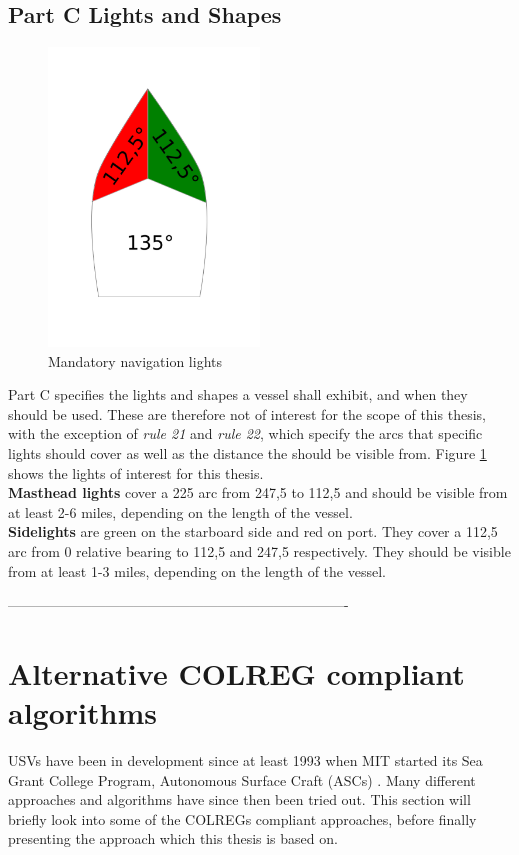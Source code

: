 \section{Part C Lights and Shapes}
\begin{figure}[H]
    \centering
    \includegraphics[width=0.5\textwidth]{Figures/lights}
    \caption{Mandatory navigation lights}
    \label{fig:nav_lights}
\end{figure}

Part C specifies the lights and shapes a vessel shall exhibit, and when they should be used. These are therefore not of interest for the scope of this thesis, with the exception of \textit{rule 21} and \textit{rule 22}, which specify the arcs that specific lights should cover as well as the distance the should be visible from. Figure \ref{fig:nav_lights} shows the lights of interest for this thesis.
\\
\textbf{Masthead lights} cover a 225 \textdegree arc from 247,5 \textdegree to 112,5 \textdegree and should be visible from at least 2-6 miles, depending on the length of the vessel.\\
\textbf{Sidelights} are green on the starboard side and red on port. They cover a 112,5 arc from 0 relative bearing to 112,5 and 247,5 respectively. They should be visible from at least 1-3 miles, depending on the length of the vessel.

-------------------------------------------------------------------------

\chapter{Alternative COLREG compliant algorithms}
USVs have been in development since at least 1993 when MIT started its Sea Grant College Program, Autonomous Surface Craft (ASCs) \cite{manley2008unmanned}. Many different approaches and algorithms have since then been tried out. This section will briefly look into some of the COLREGs compliant approaches, before finally presenting the approach which this thesis is based on.



